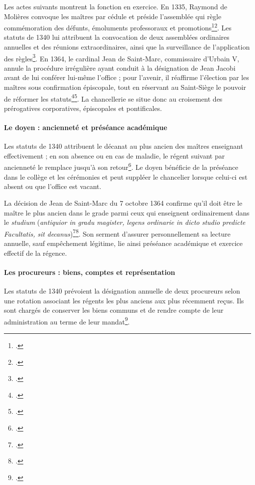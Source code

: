 Les actes suivants montrent la fonction en exercice. En 1335, Raymond de Molières convoque les maîtres par cédule et préside l'assemblée qui règle commémoration des défunts, émoluments professoraux et promotions\footcite[fol.~68~v°, vue~76/194]{ADHG1277}\footcite{Statuts1335}. Les statuts de 1340 lui attribuent la convocation de deux assemblées ordinaires annuelles et des réunions extraordinaires, ainsi que la surveillance de l'application des règles\footcite{Statuts1340}. En 1364, le cardinal Jean de Saint-Marc, commissaire d'Urbain V, annule la procédure irrégulière ayant conduit à la désignation de Jean Jacobi avant de lui conférer lui-même l'office ; pour l'avenir, il réaffirme l'élection par les maîtres sous confirmation épiscopale, tout en réservant au Saint-Siège le pouvoir de réformer les statuts\footcite[fol.~8~v°, vues~15--16/194]{ADHG1277}\footcite{JeanSaintMarc1364}. La chancellerie se situe donc au croisement des prérogatives corporatives, épiscopales et pontificales.

\paragraph{Le doyen : ancienneté et préséance académique}

Les statuts de 1340 attribuent le décanat au plus ancien des maîtres enseignant effectivement ; en son absence ou en cas de maladie, le régent suivant par ancienneté le remplace jusqu'à son retour\footcite{Statuts1340}. Le doyen bénéficie de la préséance dans le collège et les cérémonies et peut suppléer le chancelier lorsque celui-ci est absent ou que l'office est vacant.

La décision de Jean de Saint-Marc du 7 octobre 1364 confirme qu'il doit être le maître le plus ancien dans le grade parmi ceux qui enseignent ordinairement dans le \emph{studium} (\emph{antiquior in gradu magister, legens ordinarie in dicto studio predicte Facultatis, sit decanus})\footcite[fol.~8~v°, vues~15--16/194]{ADHG1277}\footcite{JeanSaintMarc1364}. Son serment d'assurer personnellement sa lecture annuelle, sauf empêchement légitime, lie ainsi préséance académique et exercice effectif de la régence.

\paragraph{Les procureurs : biens, comptes et représentation}

Les statuts de 1340 prévoient la désignation annuelle de deux procureurs selon une rotation associant les régents les plus anciens aux plus récemment reçus. Ils sont chargés de conserver les biens communs et de rendre compte de leur administration au terme de leur mandat\footcite{Statuts1340}.

